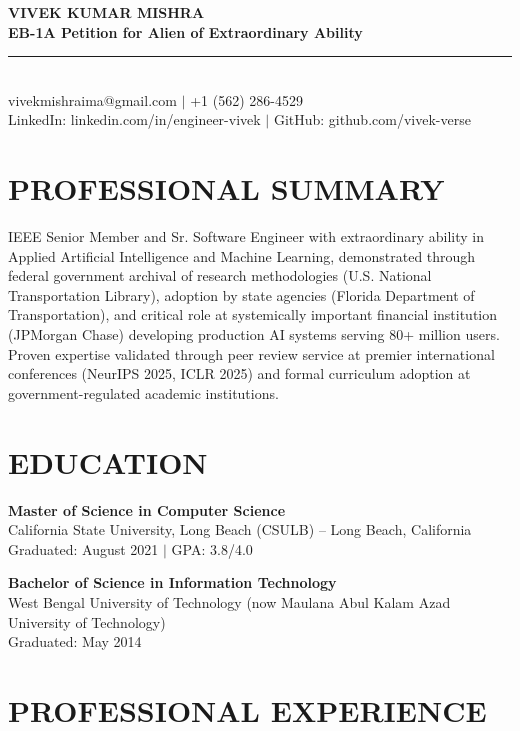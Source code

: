 \documentclass[11pt]{article}
\begin{document}
\begin{center}
{\Large\textbf{VIVEK KUMAR MISHRA}}\\[0.3em]
\textbf{EB-1A Petition for Alien of Extraordinary Ability}\\[0.5em]
\rule{\textwidth}{0.4pt}\\[0.5em]
vivekmishraima@gmail.com $\mid$ +1 (562) 286-4529\\
LinkedIn: linkedin.com/in/engineer-vivek $\mid$ GitHub: github.com/vivek-verse
\end{center}

\vspace{1em}

\section*{PROFESSIONAL SUMMARY}

IEEE Senior Member and Sr. Software Engineer with extraordinary ability in Applied Artificial Intelligence and Machine Learning, demonstrated through federal government archival of research methodologies (U.S. National Transportation Library), adoption by state agencies (Florida Department of Transportation), and critical role at systemically important financial institution (JPMorgan Chase) developing production AI systems serving 80+ million users. Proven expertise validated through peer review service at premier international conferences (NeurIPS 2025, ICLR 2025) and formal curriculum adoption at government-regulated academic institutions.

\section*{EDUCATION}

\textbf{Master of Science in Computer Science}\\
California State University, Long Beach (CSULB) -- Long Beach, California\\
Graduated: August 2021 $\mid$ GPA: 3.8/4.0

\textbf{Bachelor of Science in Information Technology}\\
West Bengal University of Technology (now Maulana Abul Kalam Azad University of Technology)\\
Graduated: May 2014

\section*{PROFESSIONAL EXPERIENCE}
\end{document}
